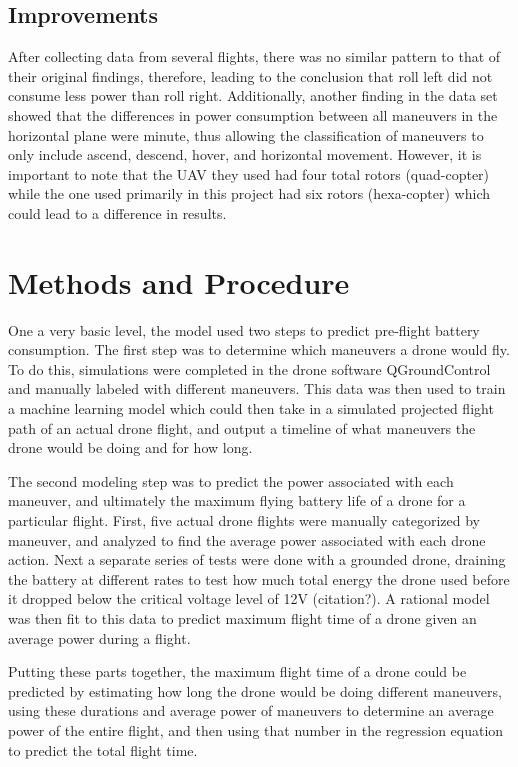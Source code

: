 \documentclass{article}
\begin{document}
\subsection{Improvements}
After collecting data from several flights, there was no similar pattern to that of their original findings, therefore, leading to the conclusion that roll left did not consume less power than roll right. Additionally, another finding in the data set showed that the differences in power consumption between all maneuvers in the horizontal plane were minute, thus allowing the classification of maneuvers to only include ascend, descend, hover, and horizontal movement. However, it is important to note that the UAV they used had four total rotors (quad-copter) while the one used primarily in this project had six rotors (hexa-copter) which could lead to a difference in results.


\section{Methods and Procedure}

One a very basic level, the model used two steps to predict pre-flight battery consumption. The first step was to determine which maneuvers a drone would fly. To do this, simulations were completed in the drone software QGroundControl and manually labeled with different maneuvers. This data was then used to train a machine learning model which could then take in a simulated projected flight path of an actual drone flight, and output a timeline of what maneuvers the drone would be doing and for how long.\par

The second modeling step was to predict the power associated with each maneuver, and ultimately the maximum flying battery life of a drone for a particular flight. First, five actual drone flights were manually categorized by maneuver, and analyzed to find the average power associated with each drone action. Next a separate series of tests were done with a grounded drone, draining the battery at different rates to test how much total energy the drone used before it dropped below the critical voltage level of 12V (citation?). A rational model was then fit to this data to predict maximum flight time of a drone given an average power during a flight.\par

Putting these parts together, the maximum flight time of a drone could be predicted by estimating how long the drone would be doing different maneuvers, using these durations and average power of maneuvers to determine an average power of the entire flight, and then using that number in the regression equation to predict the total flight time.
\end{document}
